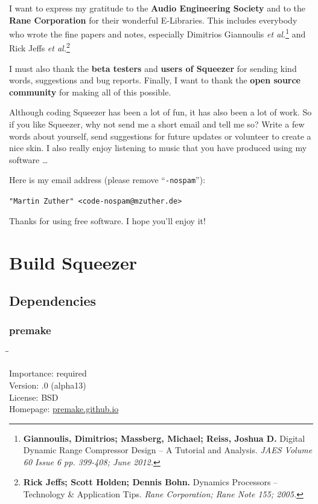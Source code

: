 I want to express my gratitude to the \textbf{Audio Engineering
  Society} and to the \textbf{Rane Corporation} for their wonderful
E-Libraries.  This includes everybody who wrote the fine papers and
notes, especially Dimitrios Giannoulis \emph{et
  al.}\footnote{\textbf{Giannoulis, Dimitrios; Massberg, Michael;
    Reiss, Joshua D.}  Digital Dynamic Range Compressor Design -- A
  Tutorial and Analysis. \emph{JAES Volume 60 Issue 6 pp. 399-408;
    June 2012.}} and Rick Jeffs \emph{et al.}\footnote{\textbf{Rick
    Jeffs; Scott Holden; Dennis Bohn.}  Dynamics Processors --
  Technology \& Application Tips.  \emph{Rane Corporation; Rane Note
    155; 2005.}}

I must also thank the \textbf{beta testers} and \textbf{users of
  Squeezer} for sending kind words, suggestions and bug reports.
Finally, I want to thank the \textbf{open source community} for making
all of this possible.

Although coding Squeezer has been a lot of fun, it has also been a lot
of work.  So if you like Squeezer, why not send me a short email and
tell me so?  Write a few words about yourself, send suggestions for
future updates or volunteer to create a nice skin.  I also really
enjoy listening to music that you have produced using my software
\dots

Here is my email address (please remove ``\texttt{-nospam}''):

\begin{center}
  \texttt{"Martin Zuther" <code-nospam@mzuther.de>}
\end{center}

Thanks for using free software.  I hope you'll enjoy it!

\appendix

\chapter{Build Squeezer}
\label{chap:build_squeezer}

\section{Dependencies}
\label{sec:dependencies}

\subsection{premake}
\label{sec:dependencies_premake}

\begin{tabbing}
  \hspace*{6em}\=\=\kill

  Importance:  \> required \\
  Version:     .0 (alpha13) \\
  License:     \> BSD \\
  Homepage:    \> \href{https://premake.github.io/}{premake.github.io}
\end{tabbing}

